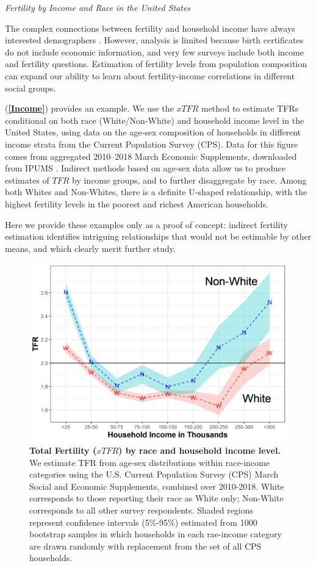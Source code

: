 \documentclass[12pt]{article}
\begin{document}
\emph{Fertility by Income and Race in the United States}

The complex connections between fertility and household income have
always interested demographers
\citep{becker1960economic, jones2008fertility}. However, analysis is
limited because birth certificates do not include economic information,
and very few surveys include both income and fertility questions.
Estimation of fertility levels from population composition can expand
our ability to learn about fertility-income correlations in different
social groups.

(\textbf{\autoref{Income}}) provides an example. We use the \(xTFR\)
method to estimate TFRs conditional on both race (White/Non-White) and
household income level in the United States, using data on the age-sex
composition of households in different income strata from the Current
Population Survey (CPS). Data for this figure comes from aggregated
2010--2018 March Economic Supplements, downloaded from IPUMS
\citep{IPUMSCPS}. Indirect methods based on age-sex data allow us to
produce estimates of \(TFR\) by income groups, and to further
disaggregate by race. Among both Whites and Non-Whites, there is a
definite U-shaped relationship, with the highest fertility levels in the
poorest and richest American households.

Here we provide these examples only as a proof of concept: indirect
fertility estimation identifies intriguing relationships that would not
be estimable by other means, and which clearly merit further study.

\begin{figure}
\centering
\includegraphics{manuscript_files/figure-latex/resample-CPS-income-race-1.png}
\caption{\textbf{Total Fertility (\(xTFR\)) by race and household income
level.} We estimate TFR from age-sex distributions within race-income
categories using the U.S. Current Population Survey (CPS) March Social
and Economic Supplements, combined over 2010-2018. White corresponds to
those reporting their race as White only; Non-White corresponds to all
other survey respondents. Shaded regions represent confidence intervals
(5\%-95\%) estimated from 1000 bootstrap samples in which households in
each rae-income category are drawn randomly with replacement from the
set of all CPS households. \label{Income}}
\end{figure}
\end{document}
